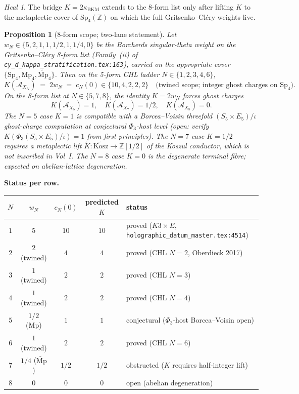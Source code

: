 \documentclass[11pt]{amsart}
\newtheorem{proposition}[theorem]{Proposition}
\theoremstyle{definition}
\theoremstyle{remark}
\newtheorem{heal}[theorem]{Heal}
\newcommand{\kBKM}{\kappa_{\mathrm{BKM}}}
\begin{document}
\begin{heal}\label{heal:uti-8form-scope}
The bridge $K = 2\kBKM$ extends to the 8-form list only after lifting $K$ to the metaplectic
cover of $\mathrm{Sp}_4(\mathbb{Z})$ on which the full Gritsenko--Cl\'ery weights live.

\begin{proposition}[8-form scope; two-lane statement]\label{prop:uti-8form-lane}
Let $w_N \in \{5, 2, 1, 1, 1/2, 1, 1/4, 0\}$ be the Borcherds singular-theta weight on the
Gritsenko--Cl\'ery 8-form list (Family~(ii) of
\texttt{cy\_d\_kappa\_stratification.tex:163}), carried on the appropriate cover
$\{\mathrm{Sp}_4, \mathrm{Mp}_4, \widetilde{\mathrm{Mp}}_4\}$. Then on the
5-form CHL ladder $N \in \{1, 2, 3, 4, 6\}$,
\[
K(\mathcal{A}_{X_N}) \;=\; 2 w_N \;=\; c_N(0) \in \{10, 4, 2, 2, 2\}
\quad \text{(twined scope; integer ghost charges on } \mathrm{Sp}_4\text{)}.
\]
On the 8-form list at $N \in \{5, 7, 8\}$, the identity $K = 2w_N$ forces ghost charges
\[
K(\mathcal{A}_{X_5}) = 1, \quad K(\mathcal{A}_{X_7}) = 1/2, \quad K(\mathcal{A}_{X_8}) = 0.
\]
The $N = 5$ case $K = 1$ is compatible with a Borcea--Voisin threefold $(S_5 \times E_5)/\iota$
ghost-charge computation at conjectural $\Phi_3$-host level (open: verify $K(\Phi_3(S_5 \times E_5)/\iota) = 1$
from first principles). The $N = 7$ case $K = 1/2$ requires a metaplectic lift
$\widetilde{K}: \widetilde{\mathrm{Kosz}} \to \mathbb{Z}[1/2]$ of the Koszul conductor, which is
\emph{not inscribed} in Vol~I. The $N = 8$ case $K = 0$ is the degenerate terminal fibre;
expected on abelian-lattice degeneration.
\end{proposition}

\textbf{Status per row.}
\begin{center}
\begin{tabular}{c|c|c|c|l}
$N$ & $w_N$ & $c_N(0)$ & predicted $K$ & status \\ \hline
$1$ & $5$ & $10$ & $10$ & proved ($K3 \times E$, \texttt{holographic\_datum\_master.tex:4514}) \\
$2$ & $2$ (twined) & $4$ & $4$ & proved (CHL $N=2$, Oberdieck 2017) \\
$3$ & $1$ (twined) & $2$ & $2$ & proved (CHL $N=3$) \\
$4$ & $1$ (twined) & $2$ & $2$ & proved (CHL $N=4$) \\
$5$ & $1/2$ (Mp) & $1$ & $1$ & conjectural ($\Phi_3$-host Borcea--Voisin open) \\
$6$ & $1$ (twined) & $2$ & $2$ & proved (CHL $N=6$) \\
$7$ & $1/4$ ($\widetilde{\mathrm{Mp}}$) & $1/2$ & $1/2$ & obstructed ($K$ requires half-integer lift) \\
$8$ & $0$ & $0$ & $0$ & open (abelian degeneration) \\
\end{tabular}
\end{center}


\end{heal}
\end{document}
